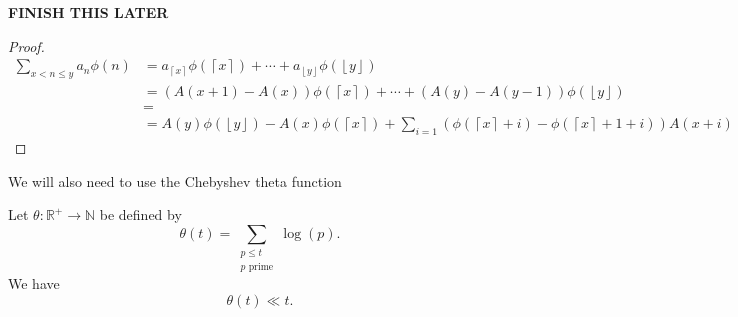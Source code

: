 \documentclass[12pt]{amsart}
\begin{document}
\textbf{FINISH THIS LATER}
\begin{proof}
\begin{align*}
    \sum _{x < n \leq y} a_{n} \phi(n) & = a_{\left\lceil x \right\rceil } \phi(\left\lceil x \right\rceil ) + \cdots  + a_{\left\lfloor y \right\rfloor } \phi(\left\lfloor y \right\rfloor )\\
    & = \left( A(x + 1) - A(x) \right) \phi(\left\lceil x \right\rceil ) + \cdots + \left( A(y) - A(y-1) \right) \phi(\left\lfloor y \right\rfloor ) \\
    & = \\
    & = A(y) \phi\left( \left\lfloor y \right\rfloor \right)  - A(x)\phi\left( \left\lceil x \right\rceil  \right) + \sum_{i= 1 }^{} \left( \phi\left( \left\lceil x \right\rceil + i \right) - \phi\left( \left\lceil x \right\rceil + 1 + i \right) \right) A(x + i)  
\end{align*}
\end{proof}

We will also need to use the Chebyshev theta function

\begin{lemma}
Let \(\theta : \mathbb{R} ^{+} \to \mathbb{N}  \) be defined by
\[
    \theta(t) = \sum _{\substack{ p \leq t \\ p \text{ prime}  }} \log \left( p \right) 
.\]
We have
\[
    \theta(t) \ll t
.\]
\end{lemma}
\end{document}
